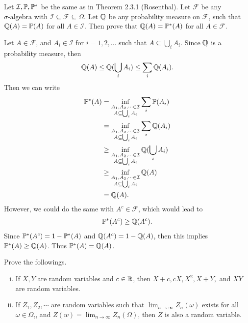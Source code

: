 \begin{problem}
	Let $ \mathcal{I},\mathbb{P}, \mathbb{P}^* $ be the same as in Theorem 2.3.1 (Rosenthal). Let $ \mathcal{F} $ be any $ \sigma\text{-algebra} $ with $ \mathcal{I} \subseteq \mathcal{F} \subseteq \Omega $. Let $ \mathbb{Q} $ be any probability measure on $ \mathcal{F} $, such that $ \mathbb{Q}(A) = \mathbb{P}(A) $ for all $ A \in \mathcal{I} $. Then prove that $ \mathbb{Q}(A) = \mathbb{P}^*(A) $ for all $ A \in \mathcal{F} $.
\end{problem}
\begin{solution}
	Let $ A \in \mathcal{F} $, and $ A_i \in \mathcal{I} $ for $ i=1,2,\dots $ such that $ A \subseteq \bigcup_i A_i $. Since $ \mathbb{Q} $ is a probability measure, then 
	\[ \mathbb{Q}(A) \leq \mathbb{Q}(\bigcup_i A_i) \leq \sum_i \mathbb{Q}(A_i). \]
	Then we can write
	\begin{align*}
		\mathbb{P}^*(A) &= \inf_{\substack{A_1,A_2,\cdots \in \mathcal{I} \\ A \subseteq \bigcup_i A_i}}\sum_i \mathbb{P}(A_i) \\
		&= \inf_{\substack{A_1,A_2,\cdots \in \mathcal{I} \\ A \subseteq \bigcup_i A_i}}\sum_i \mathbb{Q} (A_i) \\
		&\geq \inf_{\substack{A_1,A_2,\cdots \in \mathcal{I} \\ A \subseteq \bigcup_i A_i}}\mathbb{Q}(\bigcup_i A_i)\\
		&\geq \inf_{\substack{A_1,A_2,\cdots \in \mathcal{I} \\ A \subseteq \bigcup_i A_i}}\mathbb{Q}(A)\\
		& = \mathbb{Q}(A).
	\end{align*}
	However, we could do the same with $ A^c \in \mathcal{F} $, which would lead to
	\[ \mathbb{P}^*(A^c) \geq \mathbb{Q}(A^c). \]
	Since $ \mathbb{P}^*(A^c) = 1 - \mathbb{P}^*(A) $ and $ \mathbb{Q}(A^c) = 1 - \mathbb{Q}(A) $, then this implies  $  \mathbb{P}^*(A) \geq \mathbb{Q}(A)  $. Thus $ \mathbb{P}^*(A) = \mathbb{Q}(A) $.
\end{solution}


\begin{problem}
	\label{prob:capcupcapcup}
	Prove the followings.
	\begin{enumerate}[(i)]
		\item If $ X,Y $ are random variables and $ c\in\mathbb{R} $, then $ X+c, cX, X^2, X+Y,  $ and $ XY $ are random variables. 
		\item If $ Z_1,Z_2,\cdots $ are random variables such that $ \lim_{n\to \infty} Z_n(\omega) $ exists for all $ \omega\in \Omega $,, and $ Z(w) = \lim_{n\to \infty}Z_n(\Omega) $, then $ Z $ is also a random variable.
	\end{enumerate}
\end{problem}

